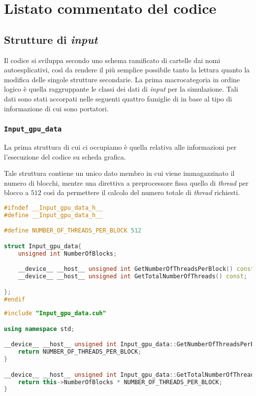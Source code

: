 \appendix
\chapter{Listato commentato del codice} \label{app:allcode}

\section{Strutture di \textit{input}}
Il codice si sviluppa secondo uno schema ramificato di cartelle dai nomi autoesplicativi, così da rendere il più semplice possibile tanto la lettura quanto la modifica delle singole strutture secondarie. La prima macrocategoria in ordine logico è quella raggruppante le classi dei dati di \textit{input} per la simulazione. Tali dati sono stati accorpati nelle seguenti quattro famiglie di  in base al tipo di informazione di cui sono portatori.

\subsection{\texttt{Input\_gpu\_data}}
La prima struttura di cui ci occupiamo è quella relativa alle informazioni per l'esecuzione del codice su scheda grafica.

Tale struttura contiene un unico dato membro in cui viene immagazzinato il numero di blocchi, mentre una direttiva a preprocessore fissa quello di \textit{thread} per blocco a $512$ così da permettere il calcolo del numero totale di \textit{thread} richiesti.

\begin{lstlisting}[language=C++, caption={\texttt{libraries/InputStructures/InputGPUData/Input\_gpu\_data.cuh}}]
#ifndef __Input_gpu_data_h__
#define __Input_gpu_data_h__

#define NUMBER_OF_THREADS_PER_BLOCK 512

struct Input_gpu_data{
	unsigned int NumberOfBlocks;

	__device__ __host__ unsigned int GetNumberOfThreadsPerBlock() const;
	__device__ __host__ unsigned int GetTotalNumberOfThreads() const;

};
#endif
\end{lstlisting}

\begin{lstlisting}[language=C++, caption={\texttt{libraries/InputStructures/InputGPUData/Input\_gpu\_data.cu}}]
#include "Input_gpu_data.cuh"

using namespace std;

__device__ __host__ unsigned int Input_gpu_data::GetNumberOfThreadsPerBlock() const{
	return NUMBER_OF_THREADS_PER_BLOCK;
}

__device__ __host__ unsigned int Input_gpu_data::GetTotalNumberOfThreads() const{
	return this->NumberOfBlocks * NUMBER_OF_THREADS_PER_BLOCK;
}
\end{lstlisting}


